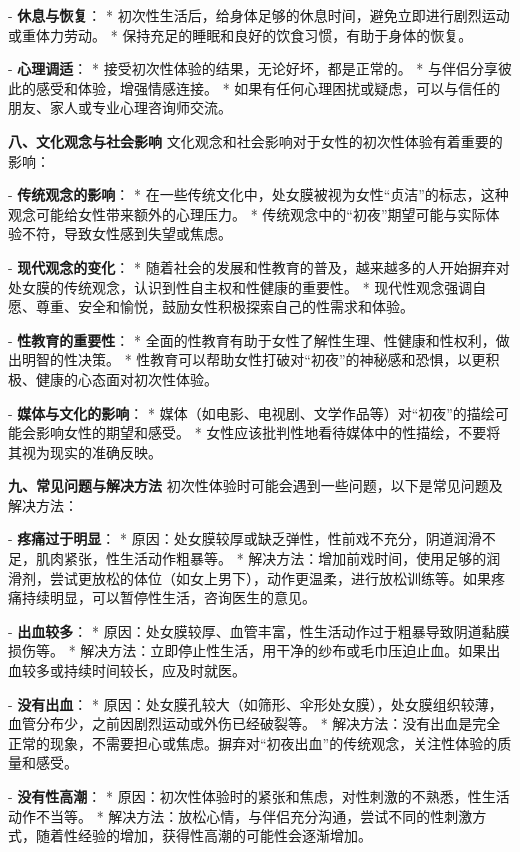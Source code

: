 \begin{enumerate}
  - \textbf{休息与恢复}：
    * 初次性生活后，给身体足够的休息时间，避免立即进行剧烈运动或重体力劳动。
    * 保持充足的睡眠和良好的饮食习惯，有助于身体的恢复。

  - \textbf{心理调适}：
    * 接受初次性体验的结果，无论好坏，都是正常的。
    * 与伴侣分享彼此的感受和体验，增强情感连接。
    * 如果有任何心理困扰或疑虑，可以与信任的朋友、家人或专业心理咨询师交流。

  \textbf{八、文化观念与社会影响}
  文化观念和社会影响对于女性的初次性体验有着重要的影响：

  - \textbf{传统观念的影响}：
    * 在一些传统文化中，处女膜被视为女性“贞洁”的标志，这种观念可能给女性带来额外的心理压力。
    * 传统观念中的“初夜”期望可能与实际体验不符，导致女性感到失望或焦虑。

  - \textbf{现代观念的变化}：
    * 随着社会的发展和性教育的普及，越来越多的人开始摒弃对处女膜的传统观念，认识到性自主权和性健康的重要性。
    * 现代性观念强调自愿、尊重、安全和愉悦，鼓励女性积极探索自己的性需求和体验。

  - \textbf{性教育的重要性}：
    * 全面的性教育有助于女性了解性生理、性健康和性权利，做出明智的性决策。
    * 性教育可以帮助女性打破对“初夜”的神秘感和恐惧，以更积极、健康的心态面对初次性体验。

  - \textbf{媒体与文化的影响}：
    * 媒体（如电影、电视剧、文学作品等）对“初夜”的描绘可能会影响女性的期望和感受。
    * 女性应该批判性地看待媒体中的性描绘，不要将其视为现实的准确反映。

  \textbf{九、常见问题与解决方法}
  初次性体验时可能会遇到一些问题，以下是常见问题及解决方法：

  - \textbf{疼痛过于明显}：
    * 原因：处女膜较厚或缺乏弹性，性前戏不充分，阴道润滑不足，肌肉紧张，性生活动作粗暴等。
    * 解决方法：增加前戏时间，使用足够的润滑剂，尝试更放松的体位（如女上男下），动作更温柔，进行放松训练等。如果疼痛持续明显，可以暂停性生活，咨询医生的意见。

  - \textbf{出血较多}：
    * 原因：处女膜较厚、血管丰富，性生活动作过于粗暴导致阴道黏膜损伤等。
    * 解决方法：立即停止性生活，用干净的纱布或毛巾压迫止血。如果出血较多或持续时间较长，应及时就医。

  - \textbf{没有出血}：
    * 原因：处女膜孔较大（如筛形、伞形处女膜），处女膜组织较薄，血管分布少，之前因剧烈运动或外伤已经破裂等。
    * 解决方法：没有出血是完全正常的现象，不需要担心或焦虑。摒弃对“初夜出血”的传统观念，关注性体验的质量和感受。

  - \textbf{没有性高潮}：
    * 原因：初次性体验时的紧张和焦虑，对性刺激的不熟悉，性生活动作不当等。
    * 解决方法：放松心情，与伴侣充分沟通，尝试不同的性刺激方式，随着性经验的增加，获得性高潮的可能性会逐渐增加。


\end{enumerate}
